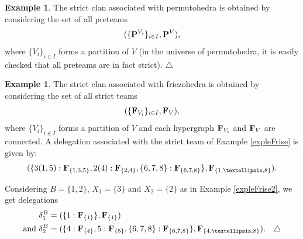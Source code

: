 \documentclass[11pt]{article}
\theoremstyle{definition}
\newtheorem{example}[theo]{Example}
\numberwithin{equation}{section}
\numberwithin{equation}{section}
\newcommand\xqed[1]{%
  \leavevmode\unskip\penalty9999 \hbox{}\nobreak\hfill
  \quad\hbox{#1}}
\newcommand\demo{\xqed{$\triangle$}}
\newcommand{\hyper}[1]{{\bf #1}}
\begin{document}
\begin{example} \label{delegPermuto}
The strict clan associated with permutohedra is obtained by considering the set of all  preteams $$(\{\hyper{P}^{V_i}\}_{i \in I}, \hyper{P}^V),$$ where $\{V_i\}_{i \in I}$ forms a partition of $V$ (in the universe of permutohedra, it is easily checked that all preteams are in fact strict).\demo
\end{example}
 
 
\begin{example} \label{expleFriseClan}
The strict clan associated with friezohedra is obtained by considering the set of all strict teams $$(\{\hyper{F}_{V_i}\}_{i \in I}, \hyper{F}_V),$$ where $\{V_i\}_{i \in I}$ forms a partition of $V$ and each hypergraph $\hyper{F}_{V_i}$ and $\hyper{F}_{V}$  are connected. A delegation associated with the strict team of Example \ref{expleFrise} is given by:
$$(\{3(1,5) : \hyper{F}_{\{1,3,5\}},2(4) : \hyper{F}_{\{2,4\}} ,\{6,7,8\} : \hyper{F}_{\{6,7,8\}}\}, \hyper{F}_{\{1,\ldots,8\}}) .$$

 Considering $B=\{1,2\}$, $X_1= \{3\}$ and $X_2= \{2\}$ as in Example \ref{expleFrise2}, we get delegations 
\begin{align*}
\delta_1^B&=(\{1 : \hyper{F}_{\{1\}}\}, \hyper{F}_{\{1\}}) \\
\text{and } \delta_2^B&=(\{ 4 : \hyper{F}_{\{4\}}, 5 : \hyper{F}_{\{5\}}, \{6,7,8\} : \hyper{F}_{\{6,7,8\}}\}, \hyper{F}_{\{4,\ldots, 8\}}) . \quad \demo
\end{align*} 

\end{example}
\end{document}
